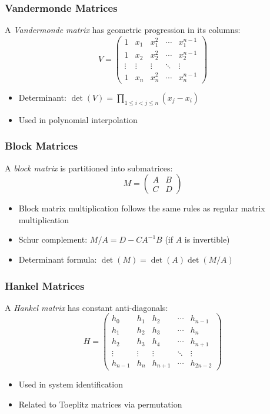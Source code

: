 \subsubsection{Vandermonde Matrices}
A \emph{Vandermonde matrix} has geometric progression in its columns:
\[
V = \begin{pmatrix}
1 & x_1 & x_1^2 & \cdots & x_1^{n-1} \\
1 & x_2 & x_2^2 & \cdots & x_2^{n-1} \\
\vdots & \vdots & \vdots & \ddots & \vdots \\
1 & x_n & x_n^2 & \cdots & x_n^{n-1}
\end{pmatrix}
\]
\begin{itemize}
    \item Determinant: $\det(V) = \prod_{1 \le i < j \le n} (x_j - x_i)$
    \item Used in polynomial interpolation
\end{itemize}

\subsubsection{Block Matrices}
A \emph{block matrix} is partitioned into submatrices:
\[
M = \begin{pmatrix}
A & B \\
C & D
\end{pmatrix}
\]
\begin{itemize}
    \item Block matrix multiplication follows the same rules as regular matrix multiplication
    \item Schur complement: $M/A = D - CA^{-1}B$ (if $A$ is invertible)
    \item Determinant formula: $\det(M) = \det(A)\det(M/A)$
\end{itemize}

\subsubsection{Hankel Matrices}
A \emph{Hankel matrix} has constant anti-diagonals:
\[
H = \begin{pmatrix}
h_0 & h_1 & h_2 & \cdots & h_{n-1} \\
h_1 & h_2 & h_3 & \cdots & h_n \\
h_2 & h_3 & h_4 & \cdots & h_{n+1} \\
\vdots & \vdots & \vdots & \ddots & \vdots \\
h_{n-1} & h_n & h_{n+1} & \cdots & h_{2n-2}
\end{pmatrix}
\]
\begin{itemize}
    \item Used in system identification
    \item Related to Toeplitz matrices via permutation
\end{itemize}
